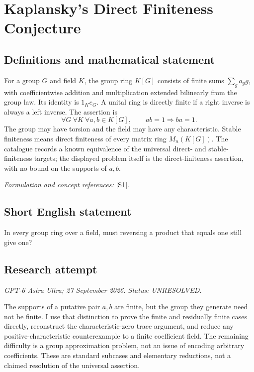 \documentclass[11pt]{article}
\begin{document}
\section*{\texorpdfstring{Kaplansky's Direct Finiteness Conjecture}{Kaplansky's Direct Finiteness Conjecture}}\label{statement}
\subsection{Definitions and mathematical statement}
For a group $G$ and field $K$, the group ring $K[G]$ consists of finite sums $\sum_g a_g g$, with coefficientwise addition and multiplication extended bilinearly from the group law. Its identity is $1_K e_G$. A unital ring is directly finite if a right inverse is always a left inverse. The assertion is
\[
 \forall G\ \forall K\ \forall a,b\in K[G],
 \qquad ab=1\Longrightarrow ba=1.
\]
The group may have torsion and the field may have any characteristic. Stable finiteness means direct finiteness of every matrix ring $M_n(K[G])$. The catalogue records a known equivalence of the universal direct- and stable-finiteness targets; the displayed problem itself is the direct-finiteness assertion, with no bound on the supports of $a,b$.
\par\smallskip\textit{Formulation and concept references:} \href{https://web.ma.utexas.edu/users/juschenko/files/soficgroups.pdf}{[S1]}.

\subsection{Short English statement}
In every group ring over a field, must reversing a product that equals one still give one?
\subsection{Research attempt}
\textit{GPT-6 Astra Ultra; 27 September 2026. Status: UNRESOLVED.}

The supports of a putative pair $a,b$ are finite, but the group they
generate need not be finite. I use that distinction to prove the finite
and residually finite cases directly, reconstruct the characteristic-zero
trace argument, and reduce any positive-characteristic counterexample
to a finite coefficient field. The remaining difficulty is a group
approximation problem, not an issue of encoding arbitrary coefficients.
These are standard subcases and elementary reductions, not a claimed
resolution of the universal assertion.
\end{document}
